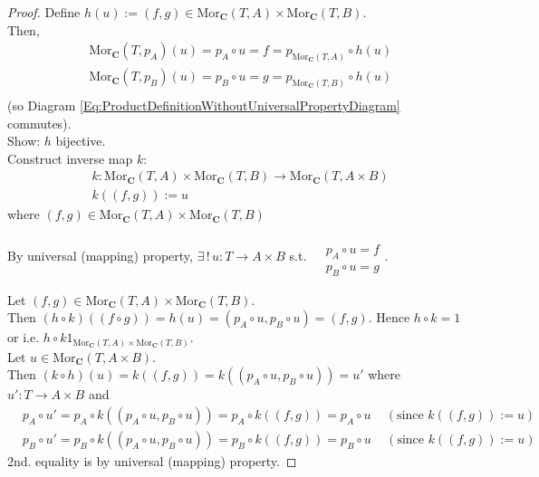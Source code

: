 \documentclass[10pt]{amsart}
\begin{document}
\begin{multicols*}{2}
\begin{proof}
	Define $h(u):= (f,g) \in \text{Mor}_{\mathbf{C}}(T,A) \times \text{Mor}_{\mathbf{C}}(T,B)$. \\
	Then, 
	\[
	\begin{aligned}
		& \text{Mor}_{\mathbf{C}}(T,p_A)(u) = p_A \circ u = f = p_{\text{Mor}_{\mathbf{C}}(T,A)} \circ h(u) \\	
		& \text{Mor}_{\mathbf{C}}(T,p_B)(u) = p_B \circ u = g = p_{\text{Mor}_{\mathbf{C}}(T,B)} \circ h(u) \\	
	\end{aligned}	
	\]
	(so Diagram \ref{Eq:ProductDefinitionWithoutUniversalPropertyDiagram} commutes). \\
	
	Show: $h$ bijective. \\
	Construct inverse map $k$:
	\[
	\begin{aligned}
		& k : \text{Mor}_{\mathbf{C}}(T,A) \times \text{Mor}_{\mathbf{C}}(T,B) \to \text{Mor}_{\mathbf{C}}(T,A\times B) \\
		& k((f,g))  := u
	\end{aligned}
	\]
	where $(f,g) \in \text{Mor}_{\mathbf{C}}(T,A) \times \text{Mor}_{\mathbf{C}}(T,B)$
	
	By universal (mapping) property, $\exists \, ! \, u :T\to A\times B$ s.t. $\begin{aligned} & \quad \\ 
	& p_A \circ u=f \\
	& p_B \circ u = g \end{aligned}$.
	
	Let $(f,g) \in \text{Mor}_{\mathbf{C}}(T,A) \times \text{Mor}_{\mathbf{C}}(T,B)$. \\
	Then $(h\circ k)((f\circ g)) = h(u) = (p_A\circ u, p_B \circ u) = (f,g)$. Hence $h\circ k =1$ or i.e. $h\circ k 1_{\text{Mor}_{\mathbf{C}}(T,A) \times \text{Mor}_{\mathbf{C}}(T,B)}$. \\
	
	Let $u\in \text{Mor}_{\mathbf{C}}(T,A\times B)$. \\
	Then $(k\circ h)(u) = k((f, g)) = k((p_A \circ u, p_B \circ u))= u'$ where $u':T\to A\times B$ and \\
	\[
	\begin{aligned} 
	& p_A \circ u' = p_A \circ k((p_A \circ u, p_B \circ u)) = p_A \circ k ((f,g)) = p_A \circ u \quad \, (\text{since $k((f,g)) := u$}) \\
	& p_B \circ u' = p_B \circ k((p_A \circ u, p_B \circ u)) = p_B \circ k ((f,g)) = p_B \circ u \quad \, (\text{since $k((f,g)) := u$}) 
	\end{aligned} 
	\]
	2nd. equality is by universal (mapping) property.


\end{proof}
\end{multicols*}
\end{document}
